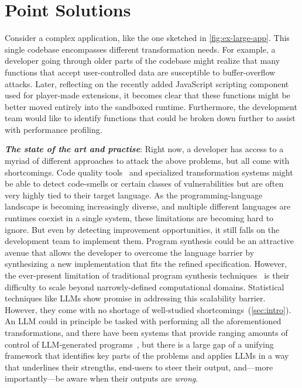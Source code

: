 \documentclass[sigplan,review,anonymous,10pt]{acmart}
\newcommand{\sys}{{\scshape Kv{\textalpha}sir}\xspace}
\newcommand{\heading}[1]{\vspace{2pt}\noindent\textbf{\emph{#1}}:\enspace}
\begin{document}



\section{Point Solutions}
\label{sec:problem}

Consider a complex application, like the one
sketched in \cref{fig:ex-large-app}.
This single codebase encompasses different transformation needs.
For example, a developer going through older parts of the codebase 
might realize that many functions that accept user-controlled data are susceptible to buffer-overflow attacks.
Later, reflecting on the recently added JavaScript scripting component used for player-made extensions, it becomes clear
that these functions might be better moved entirely into the sandboxed runtime.
Furthermore, the development team would like to identify functions that could 
be broken down further to assist with performance profiling.

\heading{The state of the art and practise}
Right now, a developer has access to a myriad of different approaches 
to attack the above problems, but all come with shortcomings.
Code quality tools~\cite{avgustinov2016ql, Fowler99,Mens04,Myers16} and specialized transformation systems might be able to detect 
code-smells or certain classes of vulnerabilities but are often very highly 
tied to their target language.
As the programming-language landscape is becoming increasingly diverse,
and multiple different languages are runtimes coexist in a single system,
these limitations are becoming hard to ignore.
But even by detecting improvement opportunities, it still falls on the development team to implement them.
Program synthesis could be an attractive avenue that allows 
the developer to overcome the language barrier by synthesizing a new implementation that fits the refined specification.
However, the ever-present limitation of traditional program synthesis techniques~\cite{jha2010oracle, raza2018disjunctive, singh2016blinkfill,wu2023programming, harp:ccs:2021, yaghmazadeh2018automated} is their
difficulty to scale beyond narrowly-defined computational domains.
Statistical techniques like LLMs show promise in addressing this scalability barrier.
However, they come with no shortage of well-studied shortcomings~(\cref{sec:intro}).
An LLM could in principle be tasked with performing all the aforementioned transformations, and
there have been systems that provide ranging amounts of control of LLM-generated 
programs~\cite{huang2023anplnaturalprogramminginteractive,li2025mccoderstreamliningmotioncontrol,barua2025pygencollaborativehumanaiapproach, tihanyi2025new},
but there is a large gap of a unifying framework that identifies 
key parts of the problems and applies LLMs in a way that underlines their strengths,
end-users to steer their output, and---more importantly---be aware when 
their outputs are \emph{wrong}.
\end{document}
